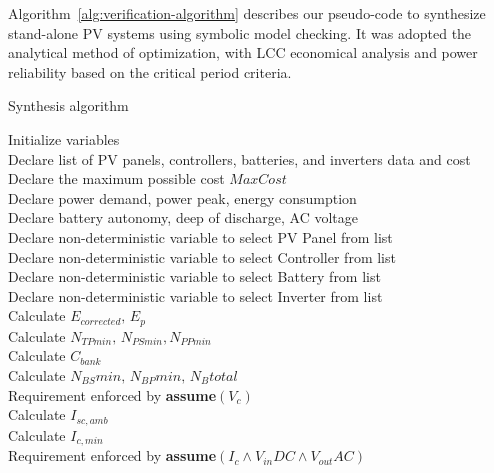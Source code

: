 \documentclass[review]{elsarticle}
\begin{document}
Algorithm~\ref{alg:verification-algorithm} describes our pseudo-code to synthesize stand-alone PV systems using symbolic model checking. It was adopted the analytical method of optimization, with LCC economical analysis and power reliability based on the critical period criteria.
%
 \begin{algorithm}
 \caption{Synthesis algorithm}
 \begin{algorithmic}[1]
 \renewcommand{\algorithmicrequire}{\textbf{Input:}}
 \renewcommand{\algorithmicensure}{\textbf{Output:}}
  \STATE Initialize variables \\
  \STATE Declare list of PV panels, controllers, batteries, and inverters data and cost \\
  \STATE Declare the maximum possible cost $MaxCost$  \\
  \STATE Declare power demand, power peak, energy consumption \\
  \STATE Declare battery autonomy, deep of discharge, AC voltage \\
 	\STATE Declare non-deterministic variable to select PV Panel from list \\
 	\STATE Declare non-deterministic variable to select Controller from list \\
 	\STATE Declare non-deterministic variable to select Battery from list \\
 	\STATE Declare non-deterministic variable to select Inverter from list \\ 	
 	\STATE Calculate $E_{corrected}, \, E_{p} $ \\
	\STATE Calculate $N_{TPmin}, \, N_{PSmin}, N_{PPmin} $ \\
 	\STATE Calculate $C_{bank}$ \\
	\STATE Calculate $N_{BS}min, \, N_{BP}min, \, N_{B}total$ \\
	\STATE Requirement enforced by \textbf{assume}$(V_{c})$ \\
 	\STATE Calculate $I_{sc,amb}$ \\
 	\STATE Calculate $I_{c,min}$ \\
 	\STATE Requirement enforced by \textbf{assume}$(I_{c} \wedge V_{in}DC \wedge V_{out}AC)$ \\

\end{algorithmic}
\end{algorithm}
\end{document}
